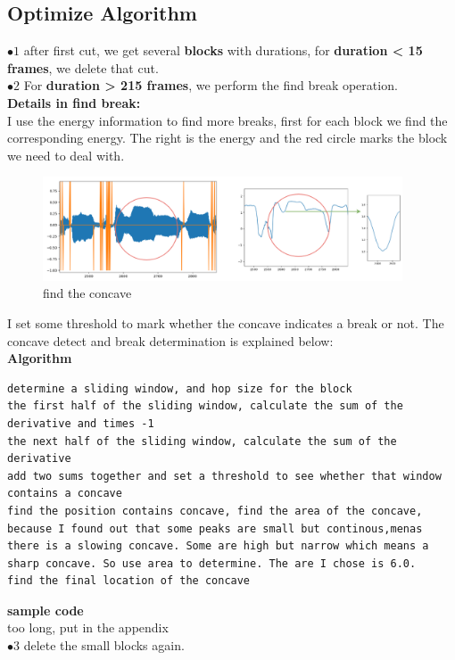 \documentclass[twoside]{article}
\begin{document}
\subsection{Optimize Algorithm}
$\bullet 1$ after first cut, we get several \textbf{blocks} with durations, for \textbf{duration < 15 frames}, we delete that cut.\\
$\bullet 2$ For \textbf{duration > 215 frames}, we perform the find break operation.\\
\textbf{Details in find break:}\\
I use the energy information to find more breaks, first for each block we find the corresponding energy. The right is the energy and the red circle marks the block we need to deal with.\\
\begin{figure}[H]
   \centering
   \includegraphics[width = 0.95\textwidth]{findbreak.png}
   \caption{find the concave}
\end{figure}
I set some threshold to mark whether the concave indicates a break or not. The concave detect and break determination is explained below:\\
\textbf{Algorithm}
\begin{lstlisting}
determine a sliding window, and hop size for the block
the first half of the sliding window, calculate the sum of the derivative and times -1
the next half of the sliding window, calculate the sum of the derivative 
add two sums together and set a threshold to see whether that window contains a concave
find the position contains concave, find the area of the concave, because I found out that some peaks are small but continous,menas there is a slowing concave. Some are high but narrow which means a sharp concave. So use area to determine. The are I chose is 6.0.
find the final location of the concave
 \end{lstlisting} 
 \textbf{sample code}\\
too long, put in the appendix\\
$\bullet 3$ delete the small blocks again.
\end{document}
